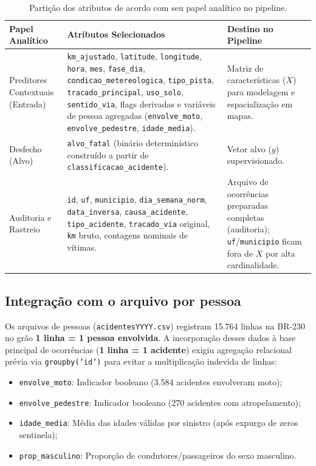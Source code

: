 \documentclass[11pt,a4paper]{article}
\begin{document}
\begin{table}[H]
  \centering
  \small
  \renewcommand{\arraystretch}{1.25}
  \caption{Partição dos atributos de acordo com seu papel analítico no pipeline.}
  \label{tab:papeis_atributos}
  \begin{tabularx}{\textwidth}{|>{\raggedright\arraybackslash}p{3.2cm}|L|>{\raggedright\arraybackslash}p{4.2cm}|}
    \hline
    \textbf{Papel Analítico} & \textbf{Atributos Selecionados} & \textbf{Destino no Pipeline} \\
    \hline
    Preditores Contextuais (Entrada) &
    \texttt{km\_ajustado}, \texttt{latitude}, \texttt{longitude}, \texttt{hora}, \texttt{mes}, \texttt{fase\_dia}, \texttt{condicao\_metereologica}, \texttt{tipo\_pista}, \texttt{tracado\_principal}, \texttt{uso\_solo}, \texttt{sentido\_via}, flags derivadas e variáveis de pessoa agregadas (\texttt{envolve\_moto}, \texttt{envolve\_pedestre}, \texttt{idade\_media}). &
    Matriz de características ($X$) para modelagem e espacialização em mapas. \\
    \hline
    Desfecho (Alvo) &
    \texttt{alvo\_fatal} (binário determinístico construído a partir de \texttt{classificacao\_acidente}). &
    Vetor alvo ($y$) supervisionado. \\
    \hline
    Auditoria e Rastreio &
    \texttt{id}, \texttt{uf}, \texttt{municipio}, \texttt{dia\_semana\_norm}, \texttt{data\_inversa}, \texttt{causa\_acidente}, \texttt{tipo\_acidente}, \texttt{tracado\_via} original, \texttt{km} bruto, contagens nominais de vítimas. &
    Arquivo de ocorrências preparadas completas (auditoria); \texttt{uf}/\texttt{municipio} ficam fora de $X$ por alta cardinalidade. \\
    \hline
  \end{tabularx}
\end{table}

\subsection{Integração com o arquivo por pessoa}

Os arquivos de pessoas (\texttt{acidentesYYYY.csv}) registram 15.764 linhas na BR-230 no grão \textbf{1 linha = 1 pessoa envolvida}. A incorporação desses dados à base principal de ocorrências (\textbf{1 linha = 1 acidente}) exigiu agregação relacional prévia via \texttt{groupby('id')} para evitar a multiplicação indevida de linhas:
\begin{itemize}
  \item \texttt{envolve\_moto}: Indicador booleano (3.584 acidentes envolveram moto);
  \item \texttt{envolve\_pedestre}: Indicador booleano (270 acidentes com atropelamento);
  \item \texttt{idade\_media}: Média das idades válidas por sinistro (após expurgo de zeros sentinela);
  \item \texttt{prop\_masculino}: Proporção de condutores/passageiros do sexo masculino.
\end{itemize}
\end{document}
